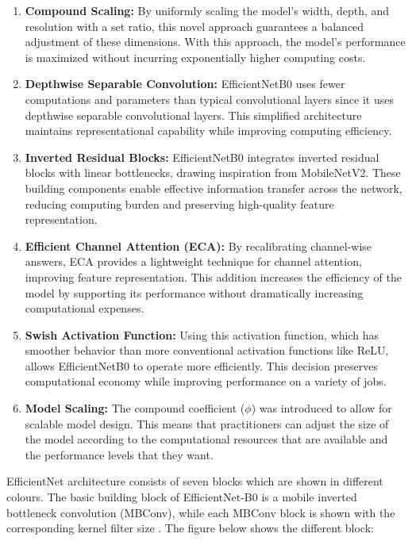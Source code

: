 \begin{enumerate}
  \item \textbf{Compound Scaling:} By uniformly scaling the model's width, depth, and resolution with a set ratio, this novel approach guarantees a balanced adjustment of these dimensions. With this approach, the model's performance is maximized without incurring exponentially higher computing costs\cite{tan2020efficientnet}.
  
  \item \textbf{Depthwise Separable Convolution:} EfficientNetB0 uses fewer computations and parameters than typical convolutional layers since it uses depthwise separable convolutional layers. This simplified architecture maintains representational capability while improving computing efficiency\cite{tan2020efficientnet}.
  
  \item \textbf{Inverted Residual Blocks:} EfficientNetB0 integrates inverted residual blocks with linear bottlenecks, drawing inspiration from MobileNetV2. These building components enable effective information transfer across the network, reducing computing burden and preserving high-quality feature representation\cite{tan2020efficientnet}.
  
  \item \textbf{Efficient Channel Attention (ECA):} By recalibrating channel-wise answers, ECA provides a lightweight technique for channel attention, improving feature representation. This addition increases the efficiency of the model by supporting its performance without dramatically increasing computational expenses\cite{tan2020efficientnet}.
  
  \item \textbf{Swish Activation Function:} Using this activation function, which has smoother behavior than more conventional activation functions like ReLU, allows EfficientNetB0 to operate more efficiently. This decision preserves computational economy while improving performance on a variety of jobs\cite{tan2020efficientnet}.
  
  \item \textbf{Model Scaling:} The compound coefficient ($\phi$) was introduced to allow for scalable model design. This means that practitioners can adjust the size of the model according to the computational resources that are available and the performance levels that they want\cite{tan2020efficientnet}.
\end{enumerate}


EfficientNet architecture consists of seven blocks which are shown in different colours. The basic building block of EfficientNet-B0 is a mobile inverted bottleneck convolution (MBConv), while each MBConv block is shown with the corresponding kernel filter size \cite{zhou2022multihead}. The figure below shows the different block:

